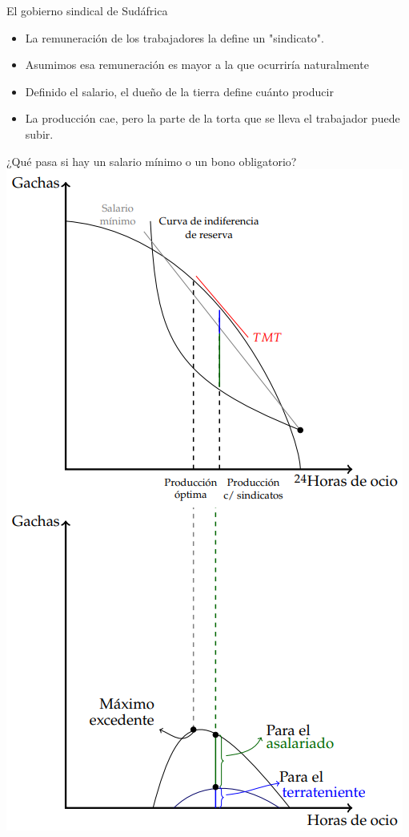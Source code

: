 \documentclass{beamer}
\begin{document}
\begin{frame}{El gobierno sindical de Sudáfrica}
\begin{itemize}
    \item La remuneración de los trabajadores la define un "sindicato". 
    \item  Asumimos esa remuneración es mayor a la que ocurriría naturalmente
    \item Definido el salario, el dueño de la tierra define cuánto producir
    \item  La producción cae, pero la parte de la torta que se lleva el trabajador puede subir. 
\end{itemize}
\end{frame}

\begin{frame}{¿Qué pasa si hay un salario mínimo o un bono obligatorio?}
\centering
\includegraphics[scale=0.45]{../Figures/C19.19.png}
\end{frame}
\end{document}
